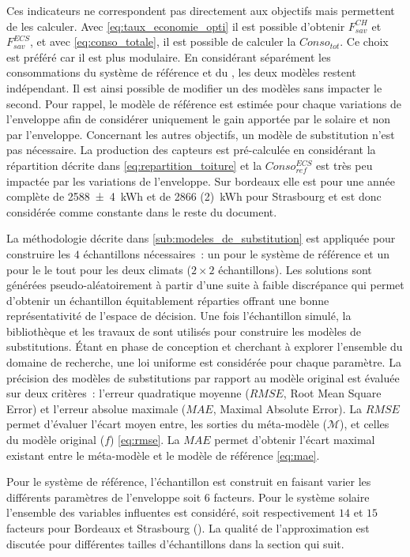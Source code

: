 Ces indicateurs ne correspondent pas directement aux objectifs mais permettent de les calculer.
Avec \eqref{eq:taux_economie_opti} il est possible d’obtenir $F_{sav}^{CH}$ et $F_{sav}^{ECS}$,
et avec \eqref{eq:conso_totale}, il est possible de calculer la $Conso_{tot}$.
Ce choix est préféré car il est plus modulaire. En considérant séparément les consommations
du système de référence et du , les deux modèles restent indépendant. Il est
ainsi possible de modifier un des modèles sans impacter le second. Pour rappel, le
modèle de référence est estimée pour chaque variations de l’enveloppe afin de considérer
uniquement le gain apportée par le solaire et non par l’enveloppe.
Concernant les autres objectifs, un modèle de substitution n’est pas nécessaire. La
production des capteurs  est pré-calculée en considérant la répartition décrite
dans \eqref{eq:repartition_toiture} et la $Conso_{ref}^{ECS}$ est très peu impactée par
les variations de l’enveloppe. Sur bordeaux elle est pour une année complète de \SI{2588(4)}{kWh}
et de \SI{2866 (2)}{kWh} pour Strasbourg et est donc considérée comme constante
dans le reste du document.

La méthodologie décrite dans \ref{sub:modeles_de_substitution} est appliquée pour
construire les $4$ échantillons nécessaires~: un pour le système de référence et un pour
le  le tout pour les deux climats ($2 \times 2$ échantillons). Les solutions sont
générées pseudo-aléatoirement à partir d’une suite à faible discrépance qui permet
d’obtenir un échantillon équitablement réparties offrant une bonne représentativité de
l’espace de décision. Une fois l’échantillon simulé, la bibliothèque
 et les travaux de \textcite{Rania2013}
sont utilisés pour construire les modèles de substitutions. Étant en phase de conception
et cherchant à explorer l’ensemble du domaine de recherche, une loi uniforme est
considérée pour chaque paramètre. La précision des modèles de substitutions par rapport au
modèle original est évaluée sur deux critères~: l’erreur quadratique moyenne ($RMSE$, Root
Mean Square Error) et l’erreur absolue maximale ($MAE$, Maximal Absolute Error). La $RMSE$
permet d’évaluer l’écart moyen entre, les sorties du méta-modèle ($\mathcal{M}$), et
celles du modèle original ($f$) \eqref{eq:rmse}. La $MAE$ permet d’obtenir l’écart maximal existant entre le
méta-modèle et le modèle de référence \eqref{eq:mae}.

Pour le système de référence, l’échantillon est construit en faisant varier les différents
paramètres de l’enveloppe soit $6$ facteurs. Pour le système solaire l’ensemble des
variables influentes est considéré, soit respectivement $14$ et $15$ facteurs pour
Bordeaux et Strasbourg ().
La qualité de l’approximation est discutée pour différentes tailles d’échantillons
dans la section qui suit.

